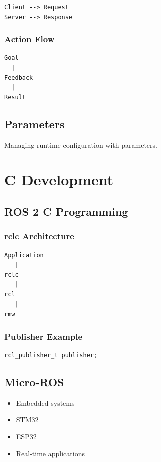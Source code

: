 \documentclass[11pt,oneside]{book}
\begin{document}
\begin{verbatim}
Client --> Request
Server --> Response
\end{verbatim}

\section{Action Flow}

\begin{verbatim}
Goal
  |
Feedback
  |
Result
\end{verbatim}

\chapter{Parameters}

Managing runtime configuration with parameters.

\part{C Development}

\chapter{ROS 2 C Programming}

\section{rclc Architecture}

\begin{verbatim}
Application
   |
rclc
   |
rcl
   |
rmw
\end{verbatim}

\section{Publisher Example}

\begin{lstlisting}[language=C]
rcl_publisher_t publisher;
\end{lstlisting}

\chapter{Micro-ROS}

\begin{itemize}
\item Embedded systems
\item STM32
\item ESP32
\item Real-time applications
\end{itemize}
\end{document}
